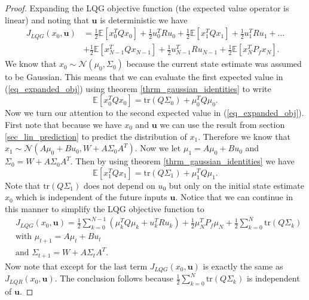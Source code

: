 \begin{proof}
Expanding the LQG objective function (the expected value operator is linear) and noting that $\mathbf{u}$ is deterministic we have  
\begin{equation}
\begin{aligned}
J_{LQG}(x_0, \mathbf{u}) &= \frac{1}{2} \mathbb{E}\left[x_0^TQx_0\right] +\frac{1}{2} u_0^TRu_0 + \frac{1}{2} \mathbb{E}\left[x_1^TQx_1\right] + \frac{1}{2}u_1^TRu_1 + \hdots \\ &+ \frac{1}{2} \mathbb{E}\left[x_{N-1}^TQx_{N-1}\right]+ \frac{1}{2}u_{N-1}^TRu_{N-1} + \frac{1}{2} \mathbb{E}\left[x_N^TP_fx_N\right].
\end{aligned}
\label{eq_expanded_obj}
\end{equation}
We know that $x_0\sim \mathcal{N}(\mu_0, \Sigma_0)$ because the current state estimate was assumed to be Gaussian. This means that we can evaluate the first expected value in (\ref{eq_expanded_obj}) using theorem \ref{thrm_gaussian_identities} to write
\begin{equation}
\mathbb{E}\left[x_0^TQx_0\right] = \text{tr}(Q\Sigma_0) + \mu_0^TQ\mu_0.
\label{eq_exp1}
\end{equation} 
Now we turn our attention to the second expected value in (\ref{eq_expanded_obj}). First note that because we have $x_0$ and $\mathbf{u}$ we can use the result from section \ref{sec_lin_prediction} to predict the distribution of $x_1$. Therefore we know that $x_1 \sim \mathcal{N}(A\mu_0+Bu_0, W+A\Sigma_0 A^T)$. Now we let $\mu_1 = A\mu_0+Bu_0$ and $\Sigma_0 = W+A\Sigma_0 A^T$. Then by using theorem \ref{thrm_gaussian_identities} we have 
\begin{equation}
\mathbb{E}\left[x_1^TQx_1\right] = \text{tr}(Q\Sigma_1) + \mu_1^TQ\mu_1.
\label{eq_exp2}
\end{equation} 
Note that $\text{tr}(Q\Sigma_1)$ does not depend on $u_0$ but only on the initial state estimate $x_0$ which is independent of the future inputs $\mathbf{u}$. Notice that we can continue in this manner to simplify the LQG objective function to
\begin{equation}
\begin{aligned}
&J_{LQG}(x_0, \mathbf{u}) = \frac{1}{2}\sum_{k=0}^{N-1} \left( \mu_k^TQ\mu_k + u_k^TRu_k \right) + \frac{1}{2}\mu_N^TP_f\mu_N + \frac{1}{2}\sum_{k=0}^N \text{tr}(Q\Sigma_k) \\
&\text{with } \mu_{t+1} = A\mu_t +Bu_t \\
&\text{and } \Sigma_{t+1} = W+A\Sigma_t A^T.
\end{aligned}
\label{eq_simpl_obj_func}
\end{equation}
Now note that except for the last term $J_{LQG}(x_0, \mathbf{u})$ is exactly the same as $J_{LQR}(x_0, \mathbf{u})$. The conclusion follows because $\frac{1}{2}\sum_{k=0}^N \text{tr}(Q\Sigma_k)$ is independent of $\mathbf{u}$. 
\end{proof}
